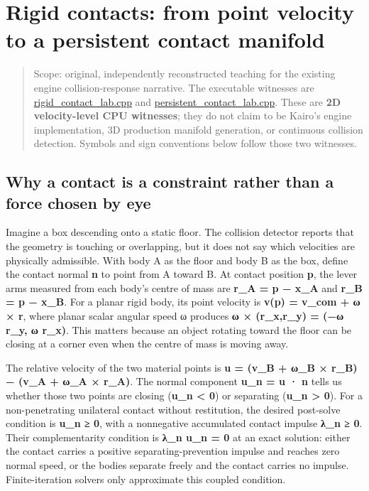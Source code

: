 \hypertarget{appendix-c9d92e145503}{}
\section{Rigid contacts: from point velocity to a persistent contact manifold}\label{appendix-c9d92e145503-rigid-contacts-from-point-velocity-to-a-persistent-contact-manifold}

\begin{quote}
Scope: original, independently reconstructed teaching for the existing engine collision-response narrative. The executable witnesses are \hyperref[source-file-103f7ae75398744dea475e34]{rigid\_contact\_lab.cpp} and \hyperref[source-file-44c320ffad9698c7abd453e2]{persistent\_contact\_lab.cpp}. These are \textbf{2D velocity-level CPU witnesses}; they do not claim to be Kairo's engine implementation, 3D production manifold generation, or continuous collision detection. Symbols and sign conventions below follow those two witnesses.
\end{quote}

\subsection{Why a contact is a constraint rather than a force chosen by eye}\label{appendix-c9d92e145503-why-a-contact-is-a-constraint-rather-than-a-force-chosen-by-eye}

Imagine a box descending onto a static floor. The collision detector reports that the geometry is touching or overlapping, but it does not say which velocities are physically admissible. With body A as the floor and body B as the box, define the contact normal \textbf{n} to point from A toward B. At contact position \textbf{p}, the lever arms measured from each body's centre of mass are \textbf{r\_A = p − x\_A} and \textbf{r\_B = p − x\_B}. For a planar rigid body, its point velocity is \textbf{v(p) = v\_com + ω × r}, where planar scalar angular speed ω produces \textbf{ω × (r\_x,r\_y) = (−ω r\_y, ω r\_x)}. This matters because an object rotating toward the floor can be closing at a corner even when the centre of mass is moving away.

The relative velocity of the two material points is \textbf{u = (v\_B + ω\_B × r\_B) − (v\_A + ω\_A × r\_A)}. The normal component \textbf{u\_n = u · n} tells us whether those two points are closing (\textbf{u\_n \textless{} 0}) or separating (\textbf{u\_n \textgreater{} 0}). For a non-penetrating unilateral contact without restitution, the desired post-solve condition is \textbf{u\_n ≥ 0}, with a nonnegative accumulated contact impulse \textbf{λ\_n ≥ 0}. Their complementarity condition is \textbf{λ\_n u\_n = 0} at an exact solution: either the contact carries a positive separating-prevention impulse and reaches zero normal speed, or the bodies separate freely and the contact carries no impulse. Finite-iteration solvers only approximate this coupled condition.

